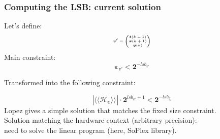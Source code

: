 \begin{frame}
	\frametitle{Computing the LSB: current solution}
	Let's define:%
			\begin{equation}
				\tiny
				\boldsymbol{v'}=
				\begin{pmatrix}
					\boldsymbol{t}(k+1) \\
					\boldsymbol{x}(k+1) \\
					\boldsymbol{y}(k)   \\
				\end{pmatrix}
			\end{equation}
	Main constraint:
		\begin{equation} \label{constraint}
			\boldsymbol{\varepsilon}_{v'} < \boldsymbol{2}^{-lsb_{v'}}
		\end{equation}

	Transformed into the following constraint:

		\begin{equation} \label{constraint}
			| \langle\langle \mathcal{H}_{\boldsymbol{\varepsilon}} \rangle\rangle_{} | \cdot \boldsymbol{2}^{lsb_{v'}+1} < \boldsymbol{2}^{-lsb_{y_i}}
		\end{equation}
	Lopez gives a simple solution that matches the fixed size constraint.\\
	Solution matching the hardware context (arbitrary precision):\\ need to solve the linear program (here, SoPlex library).

\end{frame}


